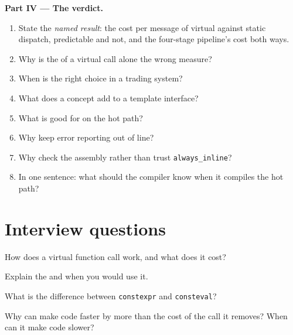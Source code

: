 \begin{problem}
\medskip\noindent\textbf{Part IV --- The verdict.}
\begin{enumerate}[resume]
\item State the \emph{named result}: the cost per message of virtual against static dispatch, predictable and not, and the
four-stage pipeline's cost both ways.
\item Why is the  of a virtual call alone the wrong measure?
\item When is  the right choice in a trading system?
\item What does a concept add to a template interface?
\item What is  good for on the hot path?
\item Why keep error reporting out of line?
\item Why check the assembly rather than trust \texttt{always\_inline}?
\item In one sentence: what should the compiler know when it compiles the hot path?
\end{enumerate}
\end{problem}

\section{Interview questions}

\begin{interviewq}\label{iq:ll:cpp-for-latency-ii-compile-time:1}
How does a virtual function call work, and what does it cost?
\end{interviewq}

\begin{interviewq}\label{iq:ll:cpp-for-latency-ii-compile-time:2}
Explain the  and when you would use it.
\end{interviewq}

\begin{interviewq}\label{iq:ll:cpp-for-latency-ii-compile-time:3}
What is the difference between \texttt{constexpr} and \texttt{consteval}?
\end{interviewq}

\begin{interviewq}\label{iq:ll:cpp-for-latency-ii-compile-time:4}
Why can  make code faster by more than the cost of the call it removes? When can it make code slower?
\end{interviewq}

